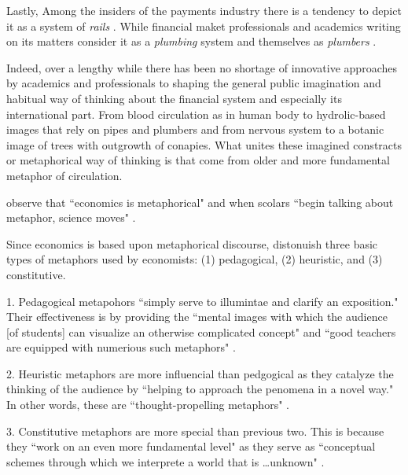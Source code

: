 Lastly, Among the insiders of the payments industry there is a tendency to depict it as a system of \textit{rails} \citep[see][]{stanescu2023}. While financial maket professionals and academics writing on its matters consider it as a \textit{plumbing} system and themselves as \textit{plumbers} \citep[see][]{davidson2000,norman2007}. 

Indeed, over a lengthy while there has been no shortage of innovative approaches by academics and professionals to shaping the general public imagination and habitual way of thinking about the financial system and especially its international part. From blood circulation as in human body to hydrolic-based images that rely on pipes and plumbers and from nervous system to a botanic image of trees with outgrowth of conapies. What unites these imagined constracts or metaphorical way of thinking is that come from older and more fundamental metaphor of circulation. 

\citeauthor{klamer1994} observe that ``economics is metaphorical" and when scolars ``begin talking about metaphor, science moves" \citep[p.~44]{klamer1994}. 

Since economics is based upon metaphorical discourse, \citeauthor{klamer1994} distonuish three basic types of metaphors used by economists: (1) pedagogical, (2) heuristic, and (3) constitutive. 

1. Pedagogical metapohors ``simply serve to illumintae and clarify an exposition." Their effectiveness is by providing the ``mental images with which the audience [of students] can visualize an otherwise complicated concept" and ``good teachers are equipped with numerious such metaphors" \citep[p.~31]{klamer1994}.

2. Heuristic metaphors are more influencial than pedgogical as they catalyze the thinking of the audience by ``helping to approach the penomena in a novel way." In other words, these are ``thought-propelling metaphors" \citep[p.~32]{klamer1994}.

3. Constitutive metaphors are more special than previous two. This is because they ``work on an even more fundamental level" as they serve as ``conceptual schemes through which we interprete a world that is \dots unknown" \citep[p.~39]{klamer1994}.


